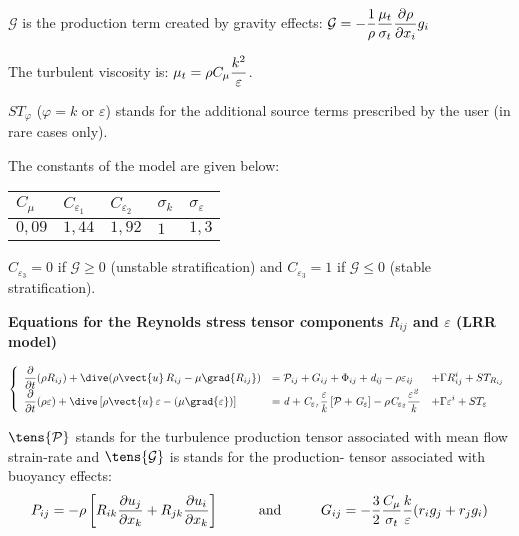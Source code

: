 $\mathcal{G}$ is the production term created by gravity effects: $%
\displaystyle \mathcal{G}=-\frac{1}{\rho}\frac{\mu_t}{\sigma_t} \frac{%
\partial\rho}{\partial x_i}g_i$

The turbulent viscosity is: $\displaystyle \mu_t=\rho C_\mu\frac{k^2}{%
\varepsilon}$.

$ST_{\varphi }$ ($\varphi =k$ or $\varepsilon $) stands for the additional
source terms prescribed by the user (in rare cases only).

The constants of the model are given below:\newline
\begin{table}[htp]
\begin{center}
\begin{tabular}{|p{}|p{}|p{}|p{}|p{}|}
\hline
$C_\mu$ & $C_{\varepsilon_1}$ & $C_{\varepsilon_2}$ & $\sigma_k$ & $%
\sigma_\varepsilon$ \\ \hline
$0,09$ & $1,44$ & $1,92$ & $1$ & $1,3$ \\ \hline
\end{tabular}%
\end{center}
\end{table}

$C_{\varepsilon_3}=0$ if $\mathcal{G}\geqslant0$ (unstable stratification)
and $C_{\varepsilon_3}=1$ if $\mathcal{G}\leqslant0$ (stable stratification).

\clearpage \textbf{Equations for the Reynolds stress tensor components $%
R_{ij}$ and $\varepsilon$ (LRR model)}

\begin{equation}
\left\{
\begin{array}{lll}
\displaystyle\frac{\partial }{\partial t}(\rho R_{ij})+\dive(\rho \vect{u}%
\,R_{ij}-\mu \grad{R_{ij}}) & =\mathcal{P}_{ij}+G_{ij}+\Phi _{ij}+\mathit{{d}%
_{ij}-\rho \varepsilon _{ij}} & \displaystyle+\Gamma R_{ij}^{i}+ST_{R_{ij}}
\\
\displaystyle\frac{\partial }{\partial t}(\rho \varepsilon )+\dive\left[
\rho \vect{u}\,\varepsilon -(\mu \grad{\varepsilon})\right]  & =\displaystyle%
\mathit{{d}+C_{\varepsilon _{1}}\frac{\varepsilon }{k}\left[ \mathcal{P}%
+G_{\varepsilon }\right] -\rho C_{\varepsilon _{2}}\frac{\varepsilon ^{2}}{k}%
} & \displaystyle+\Gamma \varepsilon ^{i}+ST_{\varepsilon }%
\end{array}%
\right.
\end{equation}

$\tens{\mathcal{P}}$ stands for the turbulence production tensor associated
with mean flow strain-rate and $\tens{\mathcal{G}}$ is stands for the
production- tensor associated with buoyancy effects:
\begin{equation}
\displaystyle P_{ij}=\displaystyle-\rho \left[ R_{ik}\frac{\partial u_{j}}{%
\partial x_{k}}+R_{jk}\frac{\partial u_{i}}{\partial x_{k}}\right] \text{%
\hspace*{1cm}and\hspace*{1cm}}G_{ij}=-\frac{3}{2}\frac{C_{\mu }}{\sigma _{t}}%
\frac{k}{\varepsilon }(r_{i}g_{j}+r_{j}g_{i})
\end{equation}

